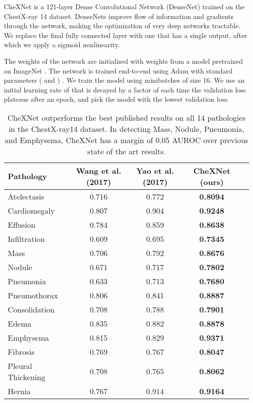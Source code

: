 \documentclass{article}
\begin{document}
CheXNet is a 121-layer Dense Convolutional
Network (DenseNet) \citep{Huang2016} trained on the ChestX-ray 14 dataset. DenseNets improve flow of information and gradients through the network, making the optimization of very deep networks tractable. We replace the final fully connected layer with one that has a single output, after which we apply a sigmoid nonlinearity. 

The weights of the network are initialized with weights from a model pretrained on ImageNet \cite{Deng2009}. The network is trained end-to-end using Adam with standard parameters ( and ) \cite{Kingma2014}. We train the model using minibatches of size 16.
We use an initial learning rate of  that is decayed by a factor of  each time the validation loss plateaus after an epoch, and pick the model with the lowest validation loss. 




\begin{table*}[ht!]    
\centering
\begin{tabular}{l c c c c}
\toprule
Pathology & Wang et al. (2017) & Yao et al. (2017) & CheXNet (ours) \\
\midrule
\midrule
 Atelectasis & 0.716 & 0.772    & \textbf{0.8094} \\
 Cardiomegaly & 0.807 & 0.904   & \textbf{0.9248} \\
 Effusion & 0.784 & 0.859       & \textbf{0.8638} \\
 Infiltration & 0.609 & 0.695   & \textbf{0.7345} \\
 Mass & 0.706 & 0.792           & \textbf{0.8676} \\
 Nodule & 0.671 & 0.717         & \textbf{0.7802} \\
 Pneumonia & 0.633 & 0.713     & \textbf{0.7680} \\
 Pneumothorax & 0.806 & 0.841  & \textbf{0.8887} \\
 Consolidation & 0.708 & 0.788 & \textbf{0.7901} \\
 Edema & 0.835 & 0.882         & \textbf{0.8878} \\
 Emphysema & 0.815 & 0.829     & \textbf{0.9371} \\
 Fibrosis & 0.769 & 0.767      & \textbf{0.8047} \\
 Pleural Thickening & 0.708 & 0.765  & \textbf{0.8062} \\
 Hernia & 0.767 & 0.914        & \textbf{0.9164} \\
\bottomrule
\end{tabular}
\caption{CheXNet outperforms the best published results on all 14 pathologies in the ChestX-ray14 dataset. In detecting Mass, Nodule, Pneumonia, and Emphysema, CheXNet has a margin of 0.05 AUROC over previous state of the art results.}
\label{tab:comparison}
\end{table*}
\end{document}
